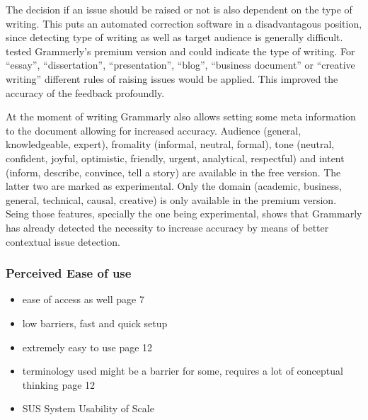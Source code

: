 \documentclass[runningheads]{llncs}
\begin{document}
The decision if an issue should be raised or not is also dependent on the type of writing. This puts an automated correction software in a disadvantagous position, since detecting type of writing as well as target audience is generally difficult. \textcite{cavaleri_you_2016} tested Grammerly's premium version and could indicate the type of writing. For ``essay'', ``dissertation'', ``presentation'', ``blog'', ``business document'' or ``creative writing'' different rules of raising issues would be applied. This improved the accuracy of the feedback profoundly.

At the moment of writing Grammarly also allows setting some meta information to the document allowing for increased accuracy. Audience (general, knowledgeable, expert), fromality (informal, neutral, formal), tone (neutral, confident, joyful, optimistic, friendly, urgent, analytical, respectful) and intent (inform, describe, convince, tell a story) are available in the free version. The latter two are marked as experimental. Only the domain (academic, business, general, technical, causal, creative) is only available in the premium version. Seing those features, specially the one being experimental, shows that Grammarly has already detected the necessity to increase accuracy by means of better contextual issue detection.



\subsubsection{Perceived Ease of use}
\begin{itemize}
    \item ease of access as well \citep{nova_utilizing_2018} page 7
    \item low barriers, fast and quick setup
    \item extremely easy to use \citep{cavaleri_you_2016} page 12
    \item terminology used might be a barrier for some, requires a lot of conceptual thinking \citep{cavaleri_you_2016} page 12
    \item SUS System Usability of Scale \citep{ventayen_graduate_2018}
\end{itemize}
\end{document}
